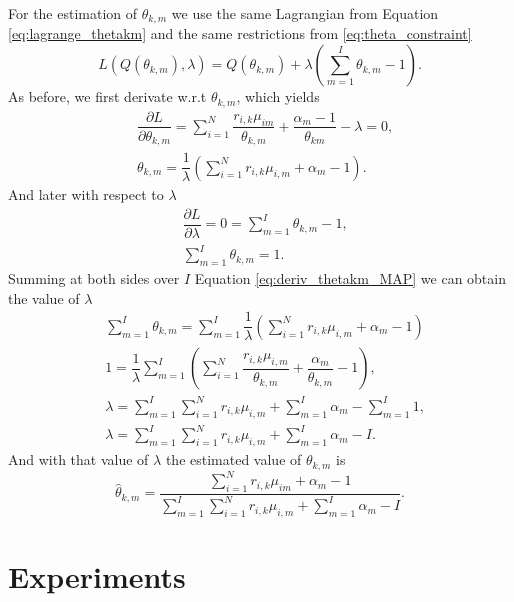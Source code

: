 \documentclass[12pt]{article}
\begin{document}
\noindent For the estimation of $\theta_{k,m}$ we use the same Lagrangian from Equation \ref{eq:lagrange_thetakm} and the same restrictions from \ref{eq:theta_constraint} 
\begin{equation}
L\left( Q(\theta_{k,m}),\lambda \right) = Q(\theta_{k,m}) + \lambda \left( \sum \limits_{m=1}^{I} \theta_{k,m} - 1 \right).
\end{equation}
As before, we first derivate w.r.t $\theta_{k,m}$, which yields
\begin{align}
& \dfrac{\partial L}{\partial \theta_{k,m}} = \sum \limits_{i=1}^{N} \dfrac{r_{i,k}\mu_{im}}{\theta_{k,m}} + \dfrac{\alpha_m-1}{\theta_{km}} - \lambda = 0, \\
& \theta_{k,m} = \dfrac{1}{\lambda} \left( \sum \limits_{i=1}^{N} r_{i,k}\mu_{i,m} +\alpha_m - 1\right) \label{eq:deriv_thetakm_MAP}.
\end{align}
And later with respect to $\lambda$
\begin{align}
& \dfrac{\partial L}{\partial \lambda} = 0 = \sum \limits_{m=1}^{I} \theta_{k,m} - 1,\\
& \sum \limits_{m=1}^{I} \theta_{k,m} = 1.
\end{align}
Summing at both sides over $I$ Equation \ref{eq:deriv_thetakm_MAP} we can obtain the value of $\lambda$
\begin{align}
& \sum \limits_{m=1}^{I}\theta_{k,m} = \sum \limits_{m=1}^{I} \dfrac{1}{\lambda} \left( \sum \limits_{i=1}^{N} r_{i,k}\mu_{i,m} + \alpha_m - 1 \right)\\
& 1 = \dfrac{1}{\lambda} \sum \limits_{m=1}^{I} \left( \sum \limits_{i=1}^{N} \dfrac{r_{i,k}\mu_{i,m}}{\theta_{k,m}} + \dfrac{\alpha_m}{\theta_{k,m}} - 1 \right),\\
& \lambda = \sum \limits_{m=1}^{I} \sum \limits_{i=1}^{N} r_{i,k}\mu_{i,m} + \sum \limits_{m=1}^{I} \alpha_m - \sum \limits_{m=1}^{I} 1,\\
& \lambda = \sum \limits_{m=1}^{I} \sum \limits_{i=1}^{N} r_{i,k}\mu_{i,m} + \sum \limits_{m=1}^{I} \alpha_m - I.
\end{align}
And with that value of $\lambda$ the estimated value of $\theta_{k,m}$ is
\begin{equation}\label{eq:theta_map}
\hat{\theta}_{k,m} = \dfrac{\sum \limits_{i=1}^{N} r_{i,k}\mu_{im} +\alpha_m - 1}{\sum \limits_{m=1}^{I} \sum \limits_{i=1}^{N} r_{i,k}\mu_{i,m} + \sum \limits_{m=1}^{I} \alpha_m - I}.
\end{equation}

\section{Experiments}
\end{document}
